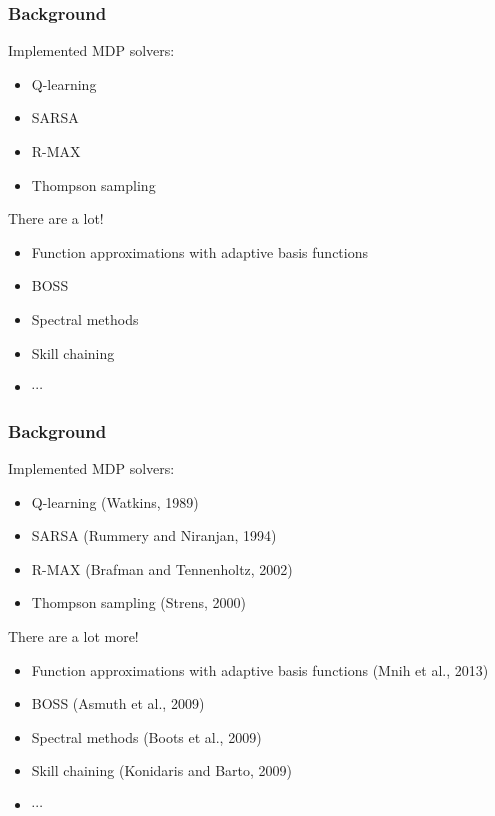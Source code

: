 \documentclass[10pt, compress]{beamer}
\begin{document}
\begin{frame}[fragile]
  \frametitle{Background}

  Implemented MDP solvers:
  \begin{itemize}
  \item Q-learning
  \item SARSA
  \item R-MAX
  \item Thompson sampling
  \end{itemize}

  There are a lot!
  \begin{itemize}
  \item Function approximations with adaptive basis functions
  \item BOSS
  \item Spectral methods
  \item Skill chaining
  \item $\cdots$
  \end{itemize}

\end{frame}

\begin{frame}[fragile]
  \frametitle{Background}

  Implemented MDP solvers:
  \begin{itemize}
  \item Q-learning \alert{(Watkins, 1989)}
  \item SARSA \alert{(Rummery and Niranjan, 1994)}
  \item R-MAX \alert{(Brafman and Tennenholtz, 2002)}
  \item Thompson sampling \alert{(Strens, 2000)}
  \end{itemize}

  There are a lot more!
  \begin{itemize}
  \item Function approximations with adaptive basis functions \alert{(Mnih et
  al., 2013)}
  \item BOSS \alert{(Asmuth et al., 2009)}
  \item Spectral methods \alert{(Boots et al., 2009)}
  \item Skill chaining \alert{(Konidaris and Barto, 2009)}
  \item $\cdots$
  \end{itemize}

\end{frame}
\end{document}
